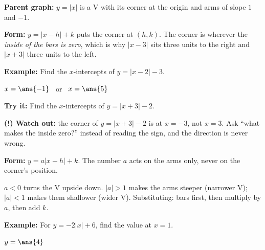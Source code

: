 \documentclass[12pt]{article}
\begin{document}


\begin{formulabox}
\textbf{Parent graph:} \quad $y = |x|$ is a V with its corner at the origin and arms of slope $1$ and $-1$.\par\smallskip
\textbf{Form:} \quad $y = |x-h| + k$ puts the corner at $(h, k)$. The corner is wherever the \emph{inside of the bars is zero}, which is why $|x-3|$ sits three units to the right and $|x+3|$ three units to the left.
\end{formulabox}

\begin{examplebox}
\textbf{Example:} \quad Find the $x$-intercepts of $y = |x-2| - 3$.
\par
$x = \ans{-1}$ \ or \ $x = \ans{5}$
\end{examplebox}

\begin{tryitbox}
\textbf{Try it:} \quad Find the $x$-intercepts of $y = |x+3| - 2$.\\[2pt]
\end{tryitbox}

\begin{watchoutbox}
\textbf{(!) Watch out:} the corner of $y = |x+3| - 2$ is at $x = -3$, not $x = 3$. Ask ``what makes the inside zero?'' instead of reading the sign, and the direction is never wrong.
\end{watchoutbox}


\begin{formulabox}
\textbf{Form:} \quad $y = a|x-h| + k$. The number $a$ acts on the arms only, never on the corner's position.\par\smallskip
$a < 0$ turns the V upside down. $|a| > 1$ makes the arms steeper (narrower V); $|a| < 1$ makes them shallower (wider V). Substituting: bars first, then multiply by $a$, then add $k$.
\end{formulabox}

\begin{examplebox}
\textbf{Example:} \quad For $y = -2|x| + 6$, find the value at $x = 1$.
\par
$y = \ans{4}$
\end{examplebox}
\end{document}
